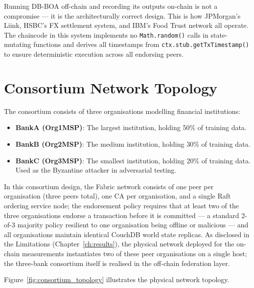 Running DB-BOA off-chain and recording its outputs on-chain is not a compromise — it is the architecturally correct design. This is how JPMorgan's Liink, HSBC's FX settlement system, and IBM's Food Trust network all operate. The chaincode in this system implements no \texttt{Math.random()} calls in state-mutating functions and derives all timestamps from \texttt{ctx.stub.getTxTimestamp()} to ensure deterministic execution across all endorsing peers.

\section{Consortium Network Topology}
\label{sec:consortium-topology}

The consortium consists of three organisations modelling financial institutions:
\begin{itemize}
  \item \textbf{BankA (Org1MSP)}: The largest institution, holding 50\% of training data.
  \item \textbf{BankB (Org2MSP)}: The medium institution, holding 30\% of training data.
  \item \textbf{BankC (Org3MSP)}: The smallest institution, holding 20\% of training data. Used as the Byzantine attacker in adversarial testing.
\end{itemize}

In this consortium design, the Fabric network consists of one peer per organisation (three peers total), one CA per organisation, and a single Raft ordering service node; the endorsement policy requires that at least two of the three organisations endorse a transaction before it is committed — a standard 2-of-3 majority policy resilient to one organisation being offline or malicious — and all organisations maintain identical CouchDB world state replicas. As disclosed in the Limitations (Chapter~\ref{ch:results}), the physical network deployed for the on-chain measurements instantiates two of these peer organisations on a single host; the three-bank consortium itself is realised in the off-chain federation layer.

Figure~\ref{fig:consortium_topology} illustrates the physical network topology.


